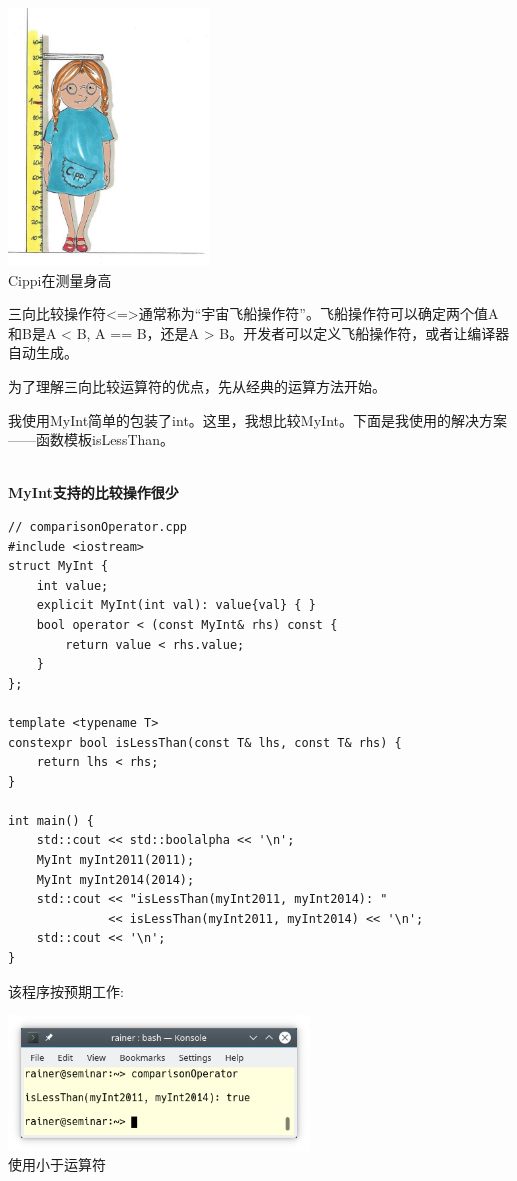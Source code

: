 
\begin{center}
\includegraphics[width=0.4\textwidth]{content/3/chapter4/images/26.png}\\
Cippi在测量身高
\end{center}

三向比较操作符<=>通常称为“宇宙飞船操作符”。飞船操作符可以确定两个值A和B是A < B, A == B，还是A > B。开发者可以定义飞船操作符，或者让编译器自动生成。

为了理解三向比较运算符的优点，先从经典的运算方法开始。


我使用MyInt简单的包装了int。这里，我想比较MyInt。下面是我使用的解决方案——函数模板isLessThan。

\hspace*{\fill} \\ %
\noindent
\textbf{MyInt支持的比较操作很少}
\begin{lstlisting}[style=styleCXX]
// comparisonOperator.cpp
#include <iostream>
struct MyInt {
	int value;
	explicit MyInt(int val): value{val} { }
	bool operator < (const MyInt& rhs) const {
		return value < rhs.value;
	}
};

template <typename T>
constexpr bool isLessThan(const T& lhs, const T& rhs) {
	return lhs < rhs;
}

int main() {
	std::cout << std::boolalpha << '\n';
	MyInt myInt2011(2011);
	MyInt myInt2014(2014);
	std::cout << "isLessThan(myInt2011, myInt2014): "
			  << isLessThan(myInt2011, myInt2014) << '\n';
	std::cout << '\n';
}
\end{lstlisting}

该程序按预期工作:

\begin{center}
\includegraphics[width=0.6\textwidth]{content/3/chapter4/images/27.png}\\
使用小于运算符
\end{center}

